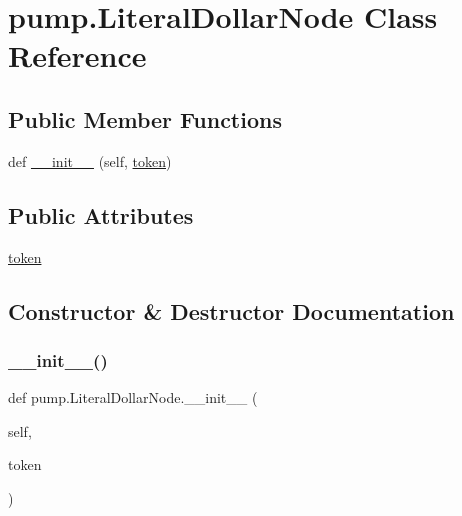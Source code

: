 \hypertarget{classpump_1_1LiteralDollarNode}{}\section{pump.\+Literal\+Dollar\+Node Class Reference}
\label{classpump_1_1LiteralDollarNode}
\subsection*{Public Member Functions}
\begin{DoxyCompactItemize}
\item 
def \mbox{\hyperlink{classpump_1_1LiteralDollarNode_a181cccad8a48f7dfdd0716e427897e0b}{\+\_\+\+\_\+init\+\_\+\+\_\+}} (self, \mbox{\hyperlink{classpump_1_1LiteralDollarNode_ab4c6e209635b8868bcdf0fe8053431c6}{token}})
\end{DoxyCompactItemize}
\subsection*{Public Attributes}
\begin{DoxyCompactItemize}
\item 
\mbox{\hyperlink{classpump_1_1LiteralDollarNode_ab4c6e209635b8868bcdf0fe8053431c6}{token}}
\end{DoxyCompactItemize}


\subsection{Constructor \& Destructor Documentation}
\mbox{\label{classpump_1_1LiteralDollarNode_a181cccad8a48f7dfdd0716e427897e0b}} 
\subsubsection{\texorpdfstring{\_\_init\_\_()}{\_\_init\_\_()}}
{\footnotesize\ttfamily def pump.\+Literal\+Dollar\+Node.\+\_\+\+\_\+init\+\_\+\+\_\+ (\begin{DoxyParamCaption}\item[{}]{self,  }\item[{}]{token }\end{DoxyParamCaption})}



